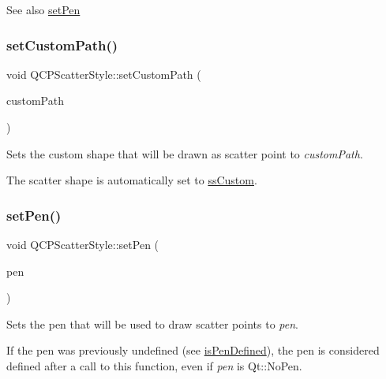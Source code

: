 \begin{DoxySeeAlso}{See also}
\mbox{\hyperlink{class_q_c_p_scatter_style_a761f1f229cc0ca4703e1e2b89f6dd1ba}{set\+Pen}} 
\end{DoxySeeAlso}
\mbox{\label{class_q_c_p_scatter_style_a96a3e949f90b2afe5677ca9412a12a1e}} 
\subsubsection{\texorpdfstring{set\+Custom\+Path()}{setCustomPath()}}
{\footnotesize\ttfamily void Q\+C\+P\+Scatter\+Style\+::set\+Custom\+Path (\begin{DoxyParamCaption}\item[{const Q\+Painter\+Path \&}]{custom\+Path }\end{DoxyParamCaption})}

Sets the custom shape that will be drawn as scatter point to {\itshape custom\+Path}.

The scatter shape is automatically set to \mbox{\hyperlink{class_q_c_p_scatter_style_adb31525af6b680e6f1b7472e43859349a15d9bcfd9de94edda949006529f9219d}{ss\+Custom}}. \mbox{\label{class_q_c_p_scatter_style_a761f1f229cc0ca4703e1e2b89f6dd1ba}} 
\subsubsection{\texorpdfstring{set\+Pen()}{setPen()}}
{\footnotesize\ttfamily void Q\+C\+P\+Scatter\+Style\+::set\+Pen (\begin{DoxyParamCaption}\item[{const Q\+Pen \&}]{pen }\end{DoxyParamCaption})}

Sets the pen that will be used to draw scatter points to {\itshape pen}.

If the pen was previously undefined (see \mbox{\hyperlink{class_q_c_p_scatter_style_a47077eb6450fe9a788f833e4ec1b1d5a}{is\+Pen\+Defined}}), the pen is considered defined after a call to this function, even if {\itshape pen} is {\ttfamily Qt\+::\+No\+Pen}.

